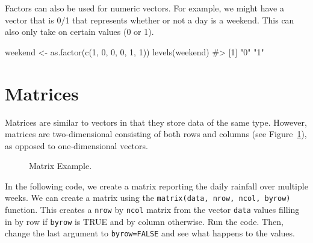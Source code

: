 \documentclass[
  letterpaper,
]{latex/krantz}
\makeatletter
\newenvironment{Shaded}{\begin{snugshade}}{\end{snugshade}}
\newcommand{\CommentTok}[1]{\textcolor[rgb]{0.37,0.37,0.37}{#1}}
\newcommand{\DecValTok}[1]{\textcolor[rgb]{0.68,0.00,0.00}{#1}}
\newcommand{\FunctionTok}[1]{\textcolor[rgb]{0.28,0.35,0.67}{#1}}
\newcommand{\NormalTok}[1]{\textcolor[rgb]{0.00,0.23,0.31}{#1}}
\newcommand{\OtherTok}[1]{\textcolor[rgb]{0.00,0.23,0.31}{#1}}
\newenvironment{kframe}{%
\medskip{}
\setlength{\fboxsep}{.8em}
 \def\at@end@of@kframe{}%
 \ifinner\ifhmode%
  \def\at@end@of@kframe{\end{minipage}}%
  \begin{minipage}{\columnwidth}%
 \fi\fi%
 \def\FrameCommand##1{\hskip\@totalleftmargin \hskip-\fboxsep
 \colorbox{shadecolor}{##1}\hskip-\fboxsep
     \hskip-\linewidth \hskip-\@totalleftmargin \hskip\columnwidth}%
 \MakeFramed {\advance\hsize-\width
   \@totalleftmargin\z@ \linewidth\hsize
   \@setminipage}}%
 {\par\unskip\endMakeFramed%
 \at@end@of@kframe}
\renewenvironment{Shaded}{\begin{kframe}}{\end{kframe}}
\makeatother
\begin{document}
Factors can also be used for numeric vectors. For example, we might have
a vector that is 0/1 that represents whether or not a day is a weekend.
This can also only take on certain values (0 or 1).

\begin{Shaded}
\begin{Highlighting}[]
\NormalTok{weekend }\OtherTok{\textless{}{-}} \FunctionTok{as.factor}\NormalTok{(}\FunctionTok{c}\NormalTok{(}\DecValTok{1}\NormalTok{, }\DecValTok{0}\NormalTok{, }\DecValTok{0}\NormalTok{, }\DecValTok{0}\NormalTok{, }\DecValTok{1}\NormalTok{, }\DecValTok{1}\NormalTok{))}
\FunctionTok{levels}\NormalTok{(weekend)}
\CommentTok{\#\textgreater{} [1] "0" "1"}
\end{Highlighting}
\end{Shaded}

\section{\texorpdfstring{Matrices
}{Matrices }}\label{matrices}

Matrices are similar to vectors in that they store data of the same
type. However, matrices are two-dimensional consisting of both rows and
columns (see Figure~\ref{fig-matrix}), as opposed to one-dimensional
vectors.

\begin{figure}


\caption{\label{fig-matrix}Matrix Example.}

\end{figure}%

In the following code, we create a matrix reporting the daily rainfall
over multiple weeks. We can create a matrix using the
\texttt{matrix(data,\ nrow,\ ncol,\ byrow)}
function. This creates a \texttt{nrow} by \texttt{ncol} matrix from the
vector \texttt{data} values filling in by row if \texttt{byrow} is TRUE
and by column otherwise. Run the code. Then, change the last argument to
\texttt{byrow=FALSE} and see what happens to the values.
\end{document}
